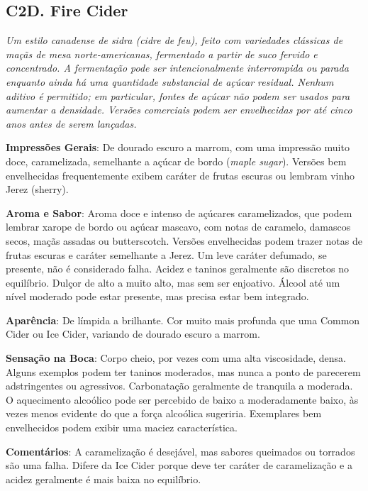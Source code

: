 \subsection*{C2D. Fire Cider}

\textit{Um estilo canadense de sidra (cidre de feu), feito com variedades clássicas de maçãs de mesa norte-americanas, fermentado a partir de suco fervido e concentrado. A fermentação pode ser intencionalmente interrompida ou parada enquanto ainda há uma quantidade substancial de açúcar residual. Nenhum aditivo é permitido; em particular, fontes de açúcar não podem ser usados para aumentar a densidade. Versões comerciais podem ser envelhecidas por até cinco anos antes de serem lançadas.}

\textbf{Impressões Gerais}: De dourado escuro a marrom, com uma impressão muito doce, caramelizada, semelhante a açúcar de bordo (\textit{maple sugar}). Versões bem envelhecidas frequentemente exibem caráter de frutas escuras ou lembram vinho Jerez (sherry).

\textbf{Aroma e Sabor}: Aroma doce e intenso de açúcares caramelizados, que podem lembrar xarope de bordo ou açúcar mascavo, com notas de caramelo, damascos secos, maçãs assadas ou butterscotch. Versões envelhecidas podem trazer notas de frutas escuras e caráter semelhante a Jerez. Um leve caráter defumado, se presente, não é considerado falha. Acidez e taninos geralmente são discretos no equilíbrio. Dulçor de alto a muito alto, mas sem ser enjoativo. Álcool até um nível moderado pode estar presente, mas precisa estar bem integrado. 

\textbf{Aparência}: De límpida a brilhante. Cor muito mais profunda que uma Common Cider ou Ice Cider, variando de dourado escuro a marrom.

\textbf{Sensação na Boca}: Corpo cheio, por vezes com uma alta viscosidade, densa. Alguns exemplos podem ter taninos moderados, mas nunca a ponto de parecerem adstringentes ou agressivos. Carbonatação geralmente de tranquila a moderada. O aquecimento alcoólico pode ser percebido de baixo a moderadamente baixo, às vezes menos evidente do que a força alcoólica sugeriria. Exemplares bem envelhecidos podem exibir uma maciez característica.

\textbf{Comentários}: A caramelização é desejável, mas sabores queimados ou torrados são uma falha. Difere da Ice Cider porque deve ter caráter de caramelização e a acidez geralmente é mais baixa no equilíbrio. 


